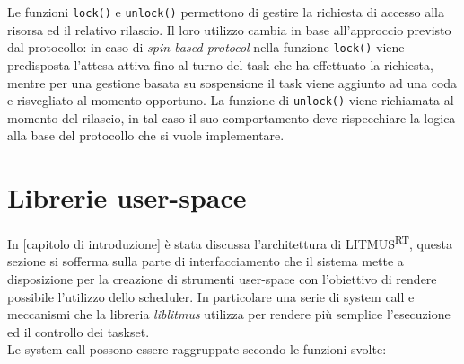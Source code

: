 \begin{appendices}
Le funzioni \texttt{lock()} e \texttt{unlock()} permettono di gestire la richiesta di accesso alla risorsa ed il relativo rilascio. Il loro utilizzo cambia in base all'approccio previsto dal protocollo: in caso di \textit{spin-based protocol} nella funzione \texttt{lock()} viene predisposta l'attesa attiva fino al turno del task che ha effettuato la richiesta, mentre per una gestione basata su sospensione il task viene aggiunto ad una coda e risvegliato al momento opportuno. La funzione di \texttt{unlock()} viene richiamata al momento del rilascio, in tal caso il suo comportamento deve rispecchiare la logica alla base del protocollo che si vuole implementare.\\

\chapter{Librerie user-space}
\label{sec:liblitmus}

In [capitolo di introduzione] è stata discussa l'architettura di LITMUS\textsuperscript{RT}, questa sezione si sofferma sulla parte di interfacciamento che il sistema mette a disposizione per la creazione di strumenti user-space con l'obiettivo di rendere possibile l'utilizzo dello scheduler. In particolare una serie di system call e meccanismi che la libreria \textit{liblitmus} utilizza per rendere più semplice l'esecuzione ed il controllo dei taskset.\\

Le system call possono essere raggruppate secondo le funzioni svolte: \\


\end{appendices}
